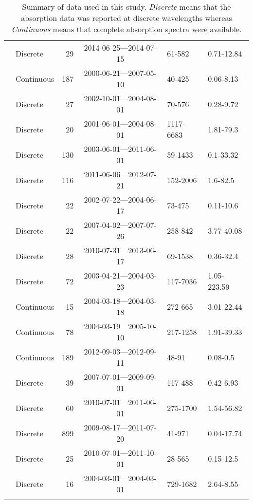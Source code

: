 \begin{longtable}{llrcll}
  \citet{Oestreich2016} & Discrete &  29 & 2014-06-25---2014-07-15 & 61-582 & 0.71-12.84 \\ 
  \citet{Osburn2007} & Continuous & 187 & 2000-06-21---2007-05-10 & 40-425 & 0.06-8.13 \\ 
  \citet{Osburn2009} & Discrete &  27 & 2002-10-01---2004-08-01 & 70-576 & 0.28-9.72 \\ 
  \citet{Osburn2011a} & Discrete &  20 & 2001-06-01---2004-08-01 & 1117-6683 & 1.81-79.3 \\ 
  \citet{Osburn2016} & Discrete & 130 & 2003-06-01---2011-06-01 & 59-1433 & 0.1-33.32 \\ 
  \citet{Polaris2012} & Discrete & 116 & 2011-06-06---2012-07-21 & 152-2006 & 1.6-82.5 \\ 
  \citet{Retamal2007} & Discrete &  22 & 2002-07-22---2004-06-17 & 73-475 & 0.11-10.6 \\ 
  \citet{shank2009} & Discrete &  22 & 2007-04-02---2007-07-26 & 258-842 & 3.77-40.08 \\ 
  \citet{Shen2014} & Discrete &  28 & 2010-07-31---2013-06-17 & 69-1538 & 0.36-32.4 \\ 
  \citet{Sickman2010} & Discrete &  72 & 2003-04-21---2004-03-23 & 117-7036 & 1.05-223.59 \\ 
  \citet{Stedmon2007a} & Continuous &  15 & 2004-03-18---2004-03-18 & 272-665 & 3.01-22.44 \\ 
  \citet{Stedmon2011} & Continuous &  78 & 2004-03-19---2005-10-10 & 217-1258 & 1.91-39.33 \\ 
  \citet{Stedmon2015} & Continuous & 189 & 2012-09-03---2012-09-11 & 48-91 & 0.08-0.5 \\ 
  \citet{Tehrani2013} & Discrete &  39 & 2007-07-01---2009-09-01 & 117-488 & 0.42-6.93 \\ 
  \citet{Wagner2015} & Discrete &  60 & 2010-07-01---2011-06-01 & 275-1700 & 1.54-56.82 \\ 
  \citet{Werdell2003} & Discrete & 899 & 2009-08-17---2011-07-20 & 41-971 & 0.04-17.74 \\ 
  \citet{Yang2013a} & Discrete &  25 & 2010-07-01---2011-10-01 & 28-565 & 0.15-12.5 \\ 
  \citet{Zhang2005} & Discrete &  16 & 2004-03-01---2004-03-01 & 729-1682 & 2.64-8.55 \\ 
   \hline
\hline
\caption{Summary of data used in this study. \textit{Discrete} means that the 
absorption data was reported at discrete wavelengths whereas 
\textit{Continuous} means that complete absorption spectra were available.} 
\end{longtable}
\endgroup

